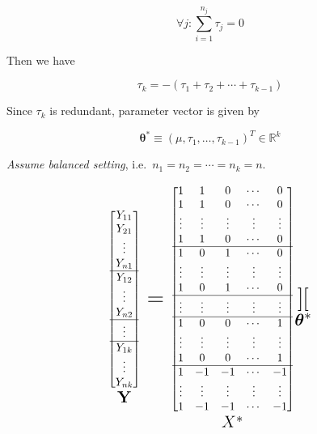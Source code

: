 \documentclass[]{book}
\theoremstyle{definition}
\theoremstyle{definition}
\theoremstyle{definition}
\theoremstyle{remark}
\begin{document}
\begin{equation}
  \forall j : \sum_{i = 1}^{n_j} \tau_j = 0
  \label{eq:effsum}
\end{equation}

Then we have

\[
\tau_k = - (\tau_1 + \tau_2 + \cdots + \tau_{k - 1})
\]

Since \(\tau_k\) is redundant, parameter vector is given by

\[\boldsymbol\theta^{\ast} \equiv (\mu, \tau_1, \ldots, \tau_{k - 1})^T \in \mathbb{R}^k\]

\emph{Assume balanced setting}, i.e.~\(n_1 = n_2 = \cdots = n_k = n\).

\[
\underset{\huge \mathbf{Y}}{\begin{bmatrix}
  Y_{11} \\
  Y_{21} \\
  \vdots \\
  Y_{n1} \\ \hline
  Y_{12} \\
  \vdots \\
  Y_{n2} \\ \hline
  \vdots \\ \hline
  Y_{1k} \\
  \vdots \\
  Y_{nk}
\end{bmatrix}} = \underset{\huge X^{\ast}}{\begin{bmatrix}
  1 & 1 & 0 & \cdots & 0 \\
  1 & 1 & 0 & \cdots & 0 \\
  \vdots & \vdots & \vdots & \vdots & \vdots \\
  1 & 1 & 0 & \cdots & 0 \\ \hline
  1 & 0 & 1 & \cdots & 0 \\
  \vdots & \vdots & \vdots & \vdots & \vdots \\
  1 & 0 & 1 & \cdots & 0 \\ \hline
  \vdots & \vdots & \vdots & \vdots & \vdots \\ \hline
  1 & 0 & 0 & \cdots & 1 \\
  \vdots & \vdots & \vdots & \vdots & \vdots \\
  1 & 0 & 0 & \cdots & 1 \\ \hline
  1 & -1 & -1 & \cdots & -1 \\
  \vdots & \vdots & \vdots & \vdots & \vdots \\
  1 & -1 & -1 & \cdots & -1
\end{bmatrix}} \underset{\huge \boldsymbol\theta^{\ast}}{\begin{bmatrix}

\end{bmatrix}}\]
\end{document}
